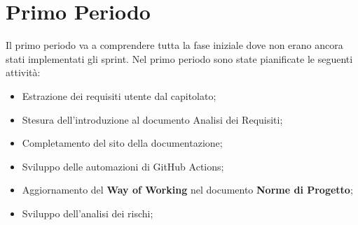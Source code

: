 \section{Primo Periodo}

\label{sec:PrimoPeriodo}
Il primo periodo va a comprendere tutta la fase iniziale dove non erano ancora stati implementati gli sprint.
Nel primo periodo sono state pianificate le seguenti attività:
\begin{itemize}
    \item Estrazione dei requisiti utente dal capitolato;
    \item Stesura dell'introduzione al documento Analisi dei Requisiti;
    \item Completamento del sito della documentazione;
    \item Sviluppo delle automazioni di GitHub Actions; 
    \item Aggiornamento del \textbf{Way of Working} nel documento \textbf{Norme di Progetto};
    \item Sviluppo dell'analisi dei rischi;
\end{itemize}




